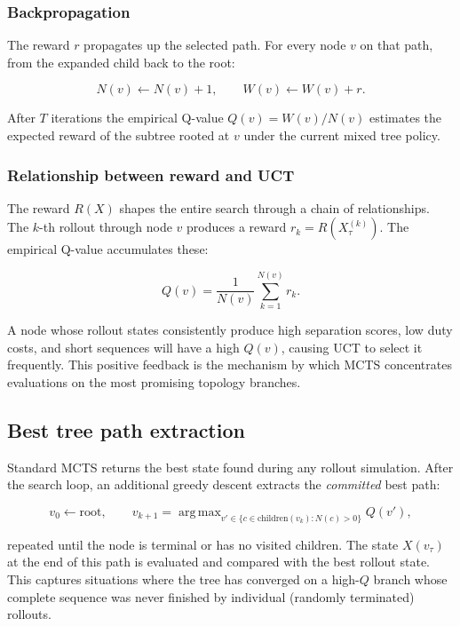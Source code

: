 \documentclass[11pt,a4paper]{article}
\theoremstyle{definition}
\theoremstyle{plain}
\DeclareMathOperator*{\argmax}{arg\,max}
\begin{document}
\subsubsection{Backpropagation}
\label{sec:backprop}

The reward $r$ propagates up the selected path. For every node $v$ on that path, from the expanded child back to the root:

\begin{equation}
 N(v) \leftarrow N(v) + 1,
 \qquad
 W(v) \leftarrow W(v) + r.
\end{equation}

After $T$ iterations the empirical Q-value $Q(v) = W(v)/N(v)$ estimates the expected reward of the subtree rooted at $v$ under the current mixed tree policy.

\subsubsection{Relationship between reward and UCT}

The reward $R(X)$ shapes the entire search through a chain of relationships. The $k$-th rollout through node $v$ produces a reward $r_k = R(X_\tau^{(k)})$. The empirical Q-value accumulates these:

\begin{equation}
 Q(v) = \frac{1}{N(v)} \sum_{k=1}^{N(v)} r_k.
\end{equation}

A node whose rollout states consistently produce high separation scores, low duty costs, and short sequences will have a high $Q(v)$, causing UCT to select it frequently. This positive feedback is the mechanism by which MCTS concentrates evaluations on the most promising topology branches.

\subsection{Best tree path extraction}
\label{sec:best_path}

Standard MCTS returns the best state found during any rollout simulation. After the search loop, an additional greedy descent extracts the \emph{committed} best path:

\begin{equation}
 v_0 \leftarrow \mathrm{root},
 \qquad
 v_{k+1} = \argmax_{v' \in \{c \in \mathrm{children}(v_k)
  : N(c) > 0\}} Q(v'),
\end{equation}

repeated until the node is terminal or has no visited children. The state $X(v_\tau)$ at the end of this path is evaluated and compared with the best rollout state. This captures situations where the tree has converged on a high-$Q$ branch whose complete sequence was never finished by individual (randomly terminated) rollouts.
\end{document}
